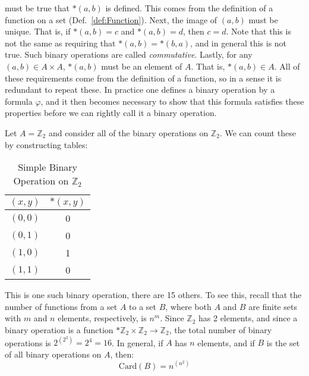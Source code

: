     must be true that $*(a,b)$ is defined. This comes from the definition of a
    function on a set (Def.~\ref{def:Function}). Next, the image of $(a,b)$ must
    be unique. That is, if $*(a,b)=c$ and $*(a,b)=d$, then $c=d$. Note that this
    is not the same as requiring that $*(a,b)=*(b,a)$, and in general this is
    not true. Such binary operations are called
    \textit{commutative}. Lastly, for any
    $(a,b)\in{A}\times{A}$, $*(a,b)$ must be an element of $A$. That is,
    $*(a,b)\in{A}$. All of these requirements come from the definition of a
    function, so in a sense it is redundant to repeat these. In practice one
    defines a binary operation by a formula $\varphi$, and it then becomes
    necessary to show that this formula satisfies these properties before we can
    rightly call it a binary operation.
    \begin{example}
        Let $A=\mathbb{Z}_{2}$ and consider all of the binary operations on
        $\mathbb{Z}_{2}$. We can count these by constructing tables:
        \begin{table}[H]
            \centering
            \begin{tabular}{c|c}
                $(x,y)$&$*(x,y)$\\
                \hline
                $(0,0)$&0\\
                $(0,1)$&0\\
                $(1,0)$&1\\
                $(1,1)$&0
            \end{tabular}
            \label{tab:Binary_Operation_on_Z_2}
            \caption{Simple Binary Operation on $\mathbb{Z}_{2}$}
        \end{table}
        This is one such binary operation, there are 15 others. To see this,
        recall that the number of functions from a set $A$ to a set $B$, where
        both $A$ and $B$ are finite sets with $m$ and $n$ elements,
        respectively, is $n^{m}$. Since $\mathbb{Z}_{2}$ has 2 elements, and
        since a binary operation is a function
        $*\mathbb{Z}_{2}\times\mathbb{Z}_{2}\rightarrow\mathbb{Z}_{2}$, the
        total number of binary operations is $2^{(2^{2})}=2^{4}=16$. In general,
        if $A$ has $n$ elements, and if $B$ is the set of all binary operations
        on $A$, then:
        \begin{equation}
            \textrm{Card}(B)=n^{(n^2)}
        \end{equation}
    \end{example}
